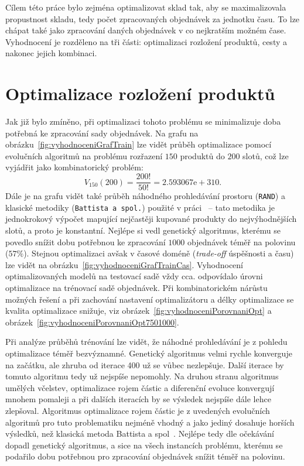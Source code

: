 Cílem této práce bylo zejména optimalizovat sklad tak, aby se maximalizovala propustnost skladu, tedy počet zpracovaných objednávek za jednotku času. To lze chápat také jako zpracování daných objednávek v co nejkratším možném čase. Vyhodnocení je rozděleno na tři části: optimalizaci rozložení produktů, cesty a nakonec jejich kombinaci.

\section{Optimalizace rozložení produktů}
Jak již bylo zmíněno, při optimalizaci tohoto problému se minimalizuje doba potřebná ke zpracování sady objednávek. Na grafu na obrázku~\ref{fig:vyhodnoceniGrafTrain} lze vidět průběh optimalizace pomocí evolučních algoritmů na problému rozřazení $150$ produktů do $200$ slotů, což lze vyjádřit jako kombinatorický problém:
\begin{equation*}
    \label{eq:optVariace}
    V_{150}(200) = \frac{200!}{50!} = 2.593067\text{e}+310.
\end{equation*}
Dále je na grafu vidět také průběh náhodného prohledávání prostoru (\texttt{RAND}) a klasické metodiky (\texttt{Battista a spol.}) použité v práci~\cite{slapSeacomp} -- tato metodika je jednokrokový výpočet mapující nejčastěji kupované produkty do nejvýhodnějších slotů, a proto je konstantní. Nejlépe si vedl genetický algoritmus, kterému se povedlo snížit dobu potřebnou ke zpracování $1000$ objednávek téměř na polovinu ($57\%$). Stejnou optimalizaci avšak v časové doméně (\emph{trade-off} úspěšnosti a času) lze vidět na obrázku~\ref{fig:vyhodnoceniGrafTrainCas}. Vyhodnocení optimalizovaných modelů na testovací sadě vždy cca. odpovídalo úrovni optimalizace na trénovací sadě objednávek. Při kombinatorickém nárůstu možných řešení a při zachování nastavení optimalizátoru a délky optimalizace se kvalita optimalizace snižuje, viz obrázek~\ref{fig:vyhodnoceniPorovnaniOpt} a obrázek~\ref{fig:vyhodnoceniPorovnaniOpt7501000}.

Při analýze průběhů trénování lze vidět, že náhodné prohledávání je z pohledu optimalizace téměř bezvýznamné. Genetický algoritmus velmi rychle konverguje na začátku, ale zhruba od iterace 400 už se vůbec nezlepšuje. Další iterace by tomuto algoritmu tedy už nejspíše nepomohly. Na druhou stranu algoritmus umělých včelstev, optimalizace rojem částic a diferenční evoluce konvergují mnohem pomaleji a při dalších iteracích by se výsledek nejspíše dále lehce zlepšoval. Algoritmus optimalizace rojem částic je z uvedených evolučních algoritmů pro tuto problematiku nejméně vhodný a jako jediný dosahuje horších výsledků, než klasická metoda Battista a spol~\cite{slapSeacomp}. Nejlépe tedy dle očekávání dopadl genetický algoritmus, a sice na všech instancích problému, kterému se podařilo dobu potřebnou pro zpracování objednávek snížit téměř na polovinu.

